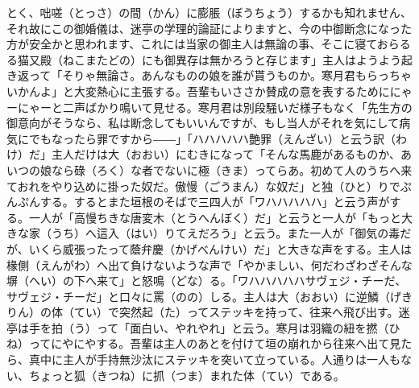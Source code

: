 \documentclass{book}
\begin{document}
とく、咄嗟（とっさ）の間（かん）に膨脹（ぼうちょう）するかも知れません、それ故にこの御婚儀は、迷亭の学理的論証によりますと、今の中御断念になった方が安全かと思われます、これには当家の御主人は無論の事、そこに寝ておらるる猫又殿（ねこまたどの）にも御異存は無かろうと存じます」主人はようよう起き返って「そりゃ無論さ。あんなものの娘を誰が貰うものか。寒月君もらっちゃいかんよ」と大変熱心に主張する。吾輩もいささか賛成の意を表するためににゃーにゃーと二声ばかり鳴いて見せる。寒月君は別段騒いだ様子もなく「先生方の御意向がそうなら、私は断念してもいいんですが、もし当人がそれを気にして病気にでもなったら罪ですから――」「ハハハハハ艶罪（えんざい）と云う訳（わけ）だ」主人だけは大（おおい）にむきになって「そんな馬鹿があるものか、あいつの娘なら碌（ろく）な者でないに極（きま）ってらあ。初めて人のうちへ来ておれをやり込めに掛った奴だ。傲慢（ごうまん）な奴だ」と独（ひと）りでぷんぷんする。するとまた垣根のそばで三四人が「ワハハハハハ」と云う声がする。一人が「高慢ちきな唐変木（とうへんぼく）だ」と云うと一人が「もっと大きな家（うち）へ這入（はい）りてえだろう」と云う。また一人が「御気の毒だが、いくら威張ったって蔭弁慶（かげべんけい）だ」と大きな声をする。主人は椽側（えんがわ）へ出て負けないような声で「やかましい、何だわざわざそんな塀（へい）の下へ来て」と怒鳴（どな）る。「ワハハハハハサヴェジ・チーだ、サヴェジ・チーだ」と口々に罵（のの）しる。主人は大（おおい）に逆鱗（げきりん）の体（てい）で突然起（た）ってステッキを持って、往来へ飛び出す。迷亭は手を拍（う）って「面白い、やれやれ」と云う。寒月は羽織の紐を撚（ひね）ってにやにやする。吾輩は主人のあとを付けて垣の崩れから往来へ出て見たら、真中に主人が手持無沙汰にステッキを突いて立っている。人通りは一人もない、ちょっと狐（きつね）に抓（つま）まれた体（てい）である。\\
\end{document}

